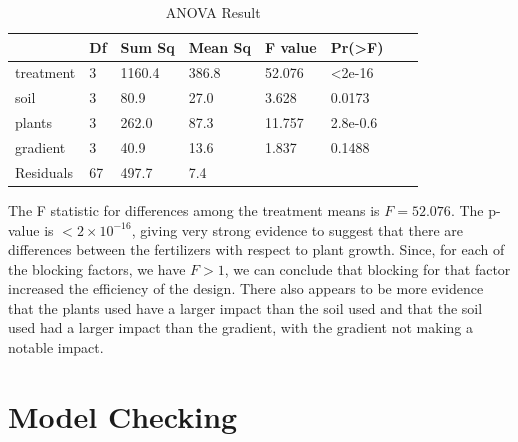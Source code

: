 \documentclass{article}
\begin{document}
\begin{table}[ht]
\centering
\begin{tabular}{llllllll}
\toprule
\textbf{ } & \textbf{Df} & \textbf{Sum Sq} & \textbf{Mean Sq} & \textbf{F value} & \textbf{Pr(\textgreater F)} & \textbf{ }\\
\midrule
treatment & 3  & 1160.4  & 386.8 & 52.076 & \textless 2e-16 \\
soil & 3  & 80.9   & 27.0 & 3.628 & 0.0173 \\
plants & 3  & 262.0   & 87.3 & 11.757 & 2.8e-0.6\\
gradient & 3  & 40.9  & 13.6 & 1.837 & 0.1488\\
Residuals & 67  & 497.7  & 7.4 & ~ & ~ \\

\bottomrule
\end{tabular}
\caption{ANOVA Result}

\end{table}
The F statistic for differences among the treatment means is $F = 52.076$. The p-value is $<2 \times 10^{-16}$, giving very strong evidence to suggest that there are differences between the
fertilizers with respect to plant growth. Since, for each of the blocking factors, we have $F > 1$, we can conclude that blocking for that factor increased the efficiency of the design. There also appears to be more evidence that the plants used have a larger impact than the soil used and that the soil used had a larger impact than the gradient, with the gradient not making a notable impact.

\section{Model Checking}
\end{document}
